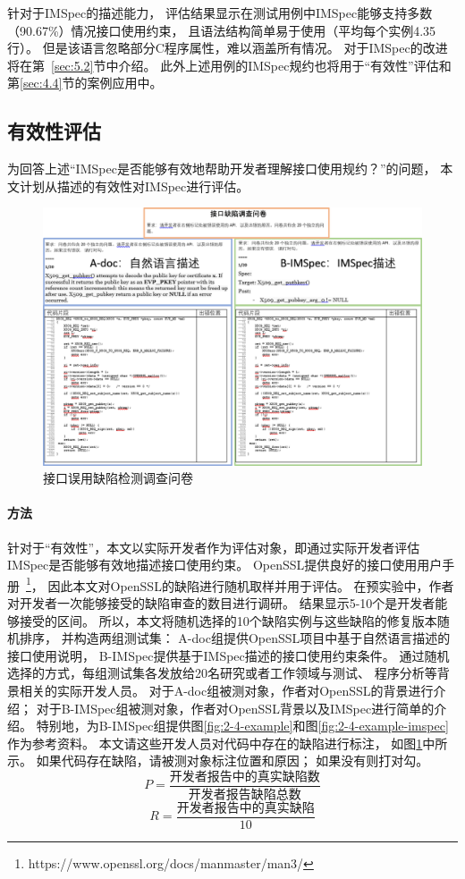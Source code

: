 针对于IMSpec的描述能力，
评估结果显示在测试用例中IMSpec能够支持多数（90.67\%）情况接口使用约束，
且语法结构简单易于使用（平均每个实例4.35行）。
但是该语言忽略部分C程序属性，难以涵盖所有情况。
对于IMSpec的改进将在第~\ref{sec:5.2}节中介绍。
此外上述用例的IMSpec规约也将用于“有效性”评估和第\ref{sec:4.4}节的案例应用中。


\subsection{有效性评估}
为回答上述“IMSpec是否能够有效地帮助开发者理解接口使用规约？”的问题，
本文计划从描述的有效性对IMSpec进行评估。

\begin{figure}[b]
	\centering
	\includegraphics[width=0.85\linewidth]{figures/cp2-survey.png}
	\caption{
		接口误用缺陷检测调查问卷
	}
	\label{fig:2-5-survey}
\end{figure}

\paragraph{方法}
针对于“有效性”，本文以实际开发者作为评估对象，即通过实际开发者评估IMSpec是否能够有效地描述接口使用约束。
OpenSSL提供良好的接口使用用户手册~\footnote{https://www.openssl.org/docs/manmaster/man3/}，
因此本文对OpenSSL的缺陷进行随机取样并用于评估。
在预实验中，作者对开发者一次能够接受的缺陷审查的数目进行调研。
结果显示5-10个是开发者能够接受的区间。
所以，本文将随机选择的10个缺陷实例与这些缺陷的修复版本随机排序，
并构造两组测试集：
A-doc组提供OpenSSL项目中基于自然语言描述的接口使用说明，
B-IMSpec提供基于IMSpec描述的接口使用约束条件。
通过随机选择的方式，每组测试集各发放给20名研究或者工作领域与测试、
程序分析等背景相关的实际开发人员。
对于A-doc组被测对象，作者对OpenSSL的背景进行介绍；
对于B-IMSpec组被测对象，作者对OpenSSL背景以及IMSpec进行简单的介绍。
特别地，为B-IMSpec组提供图\ref{fig:2-4-example}和图\ref{fig:2-4-example-imspec}作为参考资料。
本文请这些开发人员对代码中存在的缺陷进行标注，
如图\ref{fig:2-5-survey}中所示。
如果代码存在缺陷，请被测对象标注位置和原因；
如果没有则打对勾。
\begin{equation}
\label{eq:p}
P = \dfrac{\text{开发者报告中的真实缺陷数}}{\text{开发者报告缺陷总数}}
\end{equation}
\begin{equation}
\label{eq:r}
R = \dfrac{\text{开发者报告中的真实缺陷}}{10}
\end{equation}


